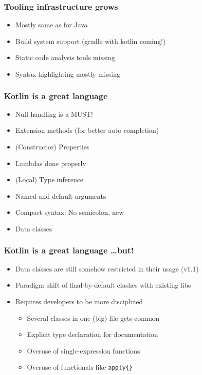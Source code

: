 

\begin{frame}
\frametitle{Tooling infrastructure grows}
\begin{itemize}
	\item Mostly same as for Java
	\item Build system support (gradle with kotlin coming!)
	\item Static code analysis tools missing
	\item Syntax highlighting mostly missing
\end{itemize}
\end{frame}

\begin{frame}
\frametitle{Kotlin is a great language}
\begin{itemize}
	\item Null handling is a MUST!
	\item Extension methods (for better auto completion)
	\item (Constructor) Properties
	\item Lambdas done properly
	\item (Local) Type inference
	\item Named and default arguments
	\item Compact syntax: No semicolon, new
	\item Data classes
\end{itemize}
\end{frame}

\begin{frame}
\frametitle{Kotlin is a great language \ldots but!}
\begin{itemize}
	\item Data classes are still somehow restricted in their usage (v1.1)
	\item Paradigm shift of final-by-default clashes with existing libs
	\item Requires developers to be more disciplined
	\begin{itemize}
		\item Several classes in one (big) file gets common
		\item Explicit type declaration for documentation
		\item Overuse of single-expression functions
		\item Overuse of functionals like \texttt{apply\{\}}
	\end{itemize}
\end{itemize}
\end{frame}


